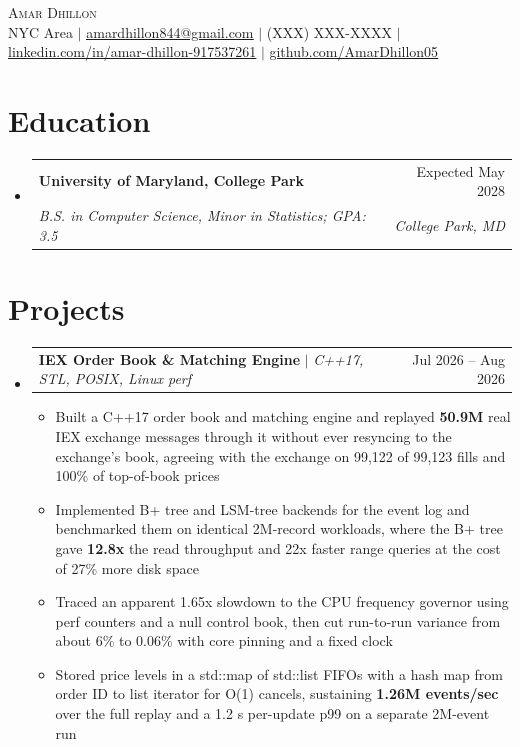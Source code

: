 \documentclass[letterpaper,10pt]{article}
\makeatletter
\newcommand{\resumeItem}[1]{\item{#1}\vspace{-1pt}}
\newcommand{\resumeSubheading}[4]{%
  \vspace{-1pt}\item
  \begin{tabular*}{\textwidth}[t]{l@{\extracolsep{\fill}}r}
    \textbf{#1} & #2 \\
    \textit{#3} & \textit{#4} \\
  \end{tabular*}\vspace{-6pt}%
}
\newcommand{\resumeProjectHeading}[2]{%
  \item
  \begin{tabular*}{\textwidth}{l@{\extracolsep{\fill}}r}
    #1 & #2 \\
  \end{tabular*}\vspace{-6pt}%
}
\newcommand{\resumeSubHeadingListStart}{\begin{itemize}[leftmargin=0in, label={}, itemsep=0pt, topsep=2pt]}
\newcommand{\resumeSubHeadingListEnd}{\end{itemize}}
\newcommand{\resumeItemListStart}{\begin{itemize}[leftmargin=0.18in, itemsep=0pt, topsep=1pt, parsep=0pt]}
\newcommand{\resumeItemListEnd}{\end{itemize}\vspace{0pt}}
\makeatother
\begin{document}
\begin{center}
  {\Huge\scshape\textcolor{accent}{Amar Dhillon}} \\ \vspace{3pt}
  \footnotesize
  NYC Area $|$
  \href{mailto:amardhillon844@gmail.com}{\underline{amardhillon844@gmail.com}} $|$
  (XXX) XXX-XXXX $|$
  \href{https://linkedin.com/in/amar-dhillon-917537261}{\underline{linkedin.com/in/amar-dhillon-917537261}} $|$
  \href{https://github.com/AmarDhillon05}{\underline{github.com/AmarDhillon05}}
\end{center}
\vspace{-6pt}

\section{Education}
\resumeSubHeadingListStart
  \resumeSubheading
    {University of Maryland, College Park}{Expected May 2028}
    {B.S. in Computer Science, Minor in Statistics; GPA: 3.5}{College Park, MD}
\resumeSubHeadingListEnd

\section{Projects}
\resumeSubHeadingListStart
  \resumeProjectHeading
    {\textbf{IEX Order Book \& Matching Engine} $|$ \textit{C++17, STL, POSIX, Linux perf}}{Jul 2026 -- Aug 2026}
  \resumeItemListStart
    \resumeItem{Built a C++17 order book and matching engine and replayed \textbf{50.9M} real IEX exchange messages through it without ever resyncing to the exchange's book, agreeing with the exchange on 99,122 of 99,123 fills and 100\% of top-of-book prices}
    \resumeItem{Implemented B+ tree and LSM-tree backends for the event log and benchmarked them on identical 2M-record workloads, where the B+ tree gave \textbf{12.8x} the read throughput and 22x faster range queries at the cost of 27\% more disk space}
    \resumeItem{Traced an apparent 1.65x slowdown to the CPU frequency governor using perf counters and a null control book, then cut run-to-run variance from about 6\% to 0.06\% with core pinning and a fixed clock}
    \resumeItem{Stored price levels in a std::map of std::list FIFOs with a hash map from order ID to list iterator for O(1) cancels, sustaining \textbf{1.26M events/sec} over the full replay and a 1.2 \textmu{}s per-update p99 on a separate 2M-event run}
  \resumeItemListEnd
\resumeSubHeadingListEnd
\end{document}
